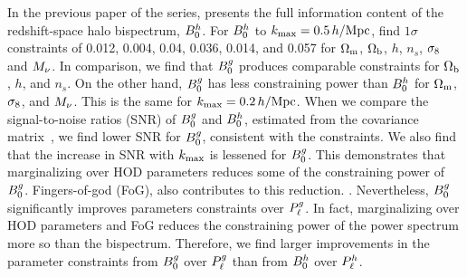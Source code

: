 In the previous paper of the series, \cite{hahn2020} presents the full
information content of the redshift-space halo bispectrum, $B^h_0$. For $B^h_0$ to
$k_{\rm max}=0.5\,h/\mathrm{Mpc}$, \cite{hahn2020} find $1\sigma$ constraints of 0.012, 0.004,
0.04, 0.036, 0.014, and 0.057 for $\Omega_{\rm m}$, $\Omega_{\rm b}$, $h$, $n_s$, $\sigma_8$ and $M_\nu$. 
In comparison, we find that $B^g_0$ produces comparable constraints for $\Omega_{\rm b}$, 
$h$, and $n_s$. On the other hand, $B^g_0$ has less constraining power than 
$B^h_0$ for $\Omega_{\rm m}$, $\sigma_8$, and $M_\nu$. This is the same for $k_{\rm max}=0.2\,h/\mathrm{Mpc}$. 
When we compare the signal-to-noise ratios (SNR) of $B^g_0$ and $B^h_0$, estimated 
from the covariance matrix~\citep[\eg][]{sefusatti2005,sefusatti2006,chan2017}, 
we find lower SNR for $B^g_0$, consistent with the constraints. We also find that 
the increase in SNR with $k_{\rm max}$ is lessened for $B^g_0$. This demonstrates that 
marginalizing over HOD parameters reduces some of the constraining power of 
$B^g_0$.  Fingers-of-god (FoG), also contributes to this reduction. 
.
Nevertheless, $B^g_0$ significantly improves parameters constraints over $P^g_{\ell}$.
In fact, marginalizing over HOD parameters and FoG reduces the constraining
power of the power spectrum more so than the bispectrum. Therefore, we find 
larger improvements in the parameter constraints from $B^g_0$ over $P^g_{\ell}$ than
from $B^h_0$ over $P^h_{\ell}$.

